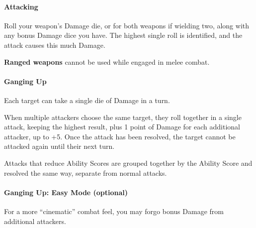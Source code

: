 \documentclass[itdr]{subfiles}
\begin{document}
\vfill

\paragraph{Attacking}
Roll your weapon's Damage die, or for both weapons if wielding two, along with any bonus Damage dice you have. The highest single roll is identified, and the attack causes this much Damage.

\textbf{Ranged weapons} cannot be used while engaged in melee combat.

\vfill

\paragraph{Ganging Up}

Each target can take a single die of Damage in a turn.

When multiple attackers choose the same target, they roll together in a single attack, keeping the highest result, plus 1 point of Damage for each additional attacker, up to +5. Once the attack has been resolved, the target cannot be attacked again until their next turn.

Attacks that reduce Ability Scores are grouped together by the Ability Score and resolved the same way, separate from normal attacks.

\begin{comment}
When multiple attackers target an individual, they roll together and keep the highest result, plus 1 point of Damage for each additional attacker, up to +5. Once the attack has been resolved, the target cannot be attacked again until their next turn.

When some of these attacks directly target Ability Scores, they are grouped together by Ability Score targeted and resolved by the same Ganging Up rule, separately from normal attacks.
\end{comment}

\vfill

\begin{dbox}
\paragraph{Ganging Up: Easy Mode (optional)}
For a more ``cinematic'' combat feel, you may forgo bonus Damage from additional attackers.
\end{dbox}
\end{document}
